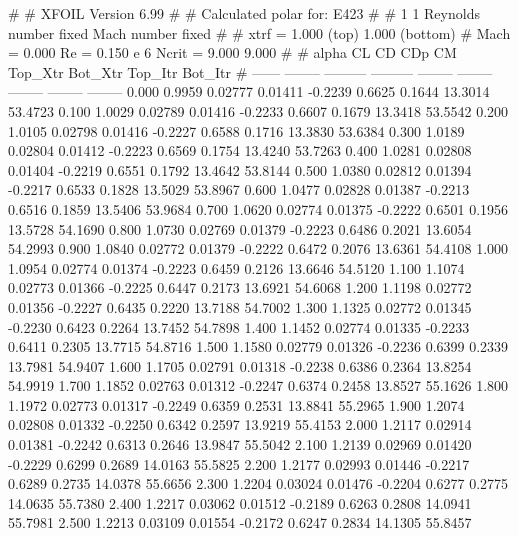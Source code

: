 #  
#       XFOIL         Version 6.99
#  
# Calculated polar for: E423                                            
#  
# 1 1 Reynolds number fixed          Mach number fixed         
#  
# xtrf =   1.000 (top)        1.000 (bottom)  
# Mach =   0.000     Re =     0.150 e 6     Ncrit =   9.000  9.000
#  
#   alpha    CL        CD       CDp       CM     Top_Xtr  Bot_Xtr  Top_Itr  Bot_Itr
#  ------ -------- --------- --------- -------- -------- -------- -------- --------
   0.000   0.9959   0.02777   0.01411  -0.2239   0.6625   0.1644  13.3014  53.4723
   0.100   1.0029   0.02789   0.01416  -0.2233   0.6607   0.1679  13.3418  53.5542
   0.200   1.0105   0.02798   0.01416  -0.2227   0.6588   0.1716  13.3830  53.6384
   0.300   1.0189   0.02804   0.01412  -0.2223   0.6569   0.1754  13.4240  53.7263
   0.400   1.0281   0.02808   0.01404  -0.2219   0.6551   0.1792  13.4642  53.8144
   0.500   1.0380   0.02812   0.01394  -0.2217   0.6533   0.1828  13.5029  53.8967
   0.600   1.0477   0.02828   0.01387  -0.2213   0.6516   0.1859  13.5406  53.9684
   0.700   1.0620   0.02774   0.01375  -0.2222   0.6501   0.1956  13.5728  54.1690
   0.800   1.0730   0.02769   0.01379  -0.2223   0.6486   0.2021  13.6054  54.2993
   0.900   1.0840   0.02772   0.01379  -0.2222   0.6472   0.2076  13.6361  54.4108
   1.000   1.0954   0.02774   0.01374  -0.2223   0.6459   0.2126  13.6646  54.5120
   1.100   1.1074   0.02773   0.01366  -0.2225   0.6447   0.2173  13.6921  54.6068
   1.200   1.1198   0.02772   0.01356  -0.2227   0.6435   0.2220  13.7188  54.7002
   1.300   1.1325   0.02772   0.01345  -0.2230   0.6423   0.2264  13.7452  54.7898
   1.400   1.1452   0.02774   0.01335  -0.2233   0.6411   0.2305  13.7715  54.8716
   1.500   1.1580   0.02779   0.01326  -0.2236   0.6399   0.2339  13.7981  54.9407
   1.600   1.1705   0.02791   0.01318  -0.2238   0.6386   0.2364  13.8254  54.9919
   1.700   1.1852   0.02763   0.01312  -0.2247   0.6374   0.2458  13.8527  55.1626
   1.800   1.1972   0.02773   0.01317  -0.2249   0.6359   0.2531  13.8841  55.2965
   1.900   1.2074   0.02808   0.01332  -0.2250   0.6342   0.2597  13.9219  55.4153
   2.000   1.2117   0.02914   0.01381  -0.2242   0.6313   0.2646  13.9847  55.5042
   2.100   1.2139   0.02969   0.01420  -0.2229   0.6299   0.2689  14.0163  55.5825
   2.200   1.2177   0.02993   0.01446  -0.2217   0.6289   0.2735  14.0378  55.6656
   2.300   1.2204   0.03024   0.01476  -0.2204   0.6277   0.2775  14.0635  55.7380
   2.400   1.2217   0.03062   0.01512  -0.2189   0.6263   0.2808  14.0941  55.7981
   2.500   1.2213   0.03109   0.01554  -0.2172   0.6247   0.2834  14.1305  55.8457
